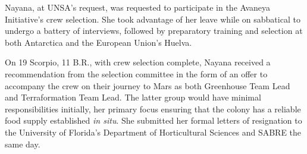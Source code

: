 Nayana, at UNSA's request, was requested to participate in the Avaneya Initiative's crew selection. She took advantage of her leave while on sabbatical to undergo a battery of interviews, followed by preparatory training and selection at both Antarctica and the European Union's Huelva. 

On 19 Scorpio, 11 B.R., with crew selection complete, Nayana received a recommendation from the selection committee in the form of an offer to accompany the crew on their journey to Mars as both Greenhouse Team Lead and Terraformation Team Lead. The latter group would have minimal responsibilities initially, her primary focus ensuring that the colony has a reliable food supply established {\it in situ}. She submitted her formal letters of resignation to the University of Florida's Department of Horticultural Sciences and SABRE the same day.

